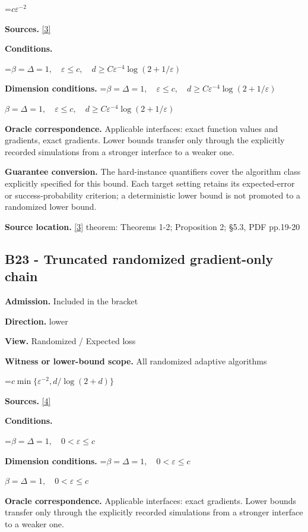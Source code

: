 \documentclass[10pt,a4paper]{article}
\newcommand{\AtlasMath}[1]{\par\begingroup\centering\setbox0=\hbox{$\displaystyle #1$}\ifdim\wd0>1.4\linewidth\typeout{ATLAS WIDE FORMULA: \the\wd0}\fi\ifdim\wd0>\linewidth\resizebox{\linewidth}{!}{\box0}\else\box0\fi\par\endgroup}
\newcommand{\AtlasInlineMath}[1]{\begingroup\setbox0=\hbox{$#1$}\ifdim\wd0>.4\linewidth\endgroup\AtlasMath{#1}\else\endgroup$#1$\fi}
\begin{document}
\AtlasMath{c\varepsilon^{-2}}
\textbf{Sources.} \href{https://arxiv.org/pdf/1710.11606}{[3]}

\textbf{Conditions.} 


\AtlasMath{\beta=\Delta=1,\quad\varepsilon\le c,\quad d\ge C\varepsilon^{-4}\log(2+1/\varepsilon)}




\textbf{Dimension conditions.} \AtlasInlineMath{\beta=\Delta=1,\quad\varepsilon\le c,\quad d\ge C\varepsilon^{-4}\log(2+1/\varepsilon)}

\textbf{Oracle correspondence.} Applicable interfaces: exact function values and gradients, exact gradients. Lower bounds transfer only through the explicitly recorded simulations from a stronger interface to a weaker one.

\textbf{Guarantee conversion.} The hard-instance quantifiers cover the algorithm class explicitly specified for this bound. Each target setting retains its expected-error or success-probability criterion; a deterministic lower bound is not promoted to a randomized lower bound.

\textbf{Source location.} \href{https://arxiv.org/pdf/1710.11606}{[3]} theorem: Theorems 1-2; Proposition 2; §5.3, PDF pp.19-20

\subsection{B23 - Truncated randomized gradient-only chain}
\textbf{Admission.} Included in the bracket

\textbf{Direction.} lower

\textbf{View.} Randomized / Expected loss

\textbf{Witness or lower-bound scope.} All randomized adaptive algorithms

\AtlasMath{c\min\{\varepsilon^{-2},d/\log(2+d)\}}
\textbf{Sources.} \href{https://proceedings.mlr.press/v313/liu26a.html}{[4]}

\textbf{Conditions.} 


\AtlasMath{\beta=\Delta=1,\quad0<\varepsilon\le c}




\textbf{Dimension conditions.} \AtlasInlineMath{\beta=\Delta=1,\quad0<\varepsilon\le c}

\textbf{Oracle correspondence.} Applicable interfaces: exact gradients. Lower bounds transfer only through the explicitly recorded simulations from a stronger interface to a weaker one.
\end{document}
